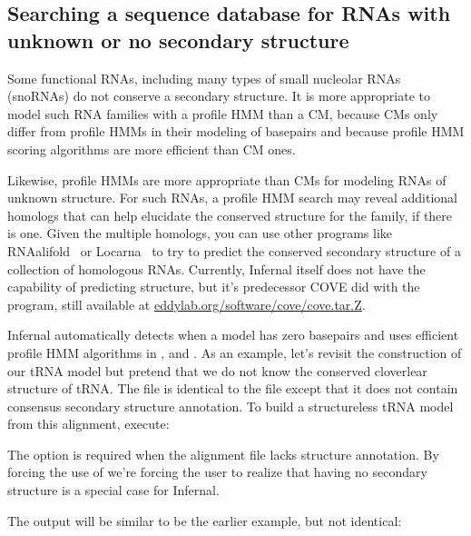 \subsection{Searching a sequence database for RNAs with unknown or no
 secondary structure}

Some functional RNAs, including many types of small nucleolar RNAs
(snoRNAs) do not conserve a secondary structure. It is more
appropriate to model such RNA families with a profile HMM than a CM,
because CMs only differ from profile HMMs in their modeling of
basepairs and because profile HMM scoring algorithms are more
efficient than CM ones.

Likewise, profile HMMs are more appropriate than CMs for modeling RNAs
of unknown structure. For such RNAs, a profile HMM search may reveal
additional homologs that can help elucidate the conserved structure
for the family, if there is one. Given the multiple homologs, you can
use other programs like RNAalifold~\citep{Bernhart08,Hofacker02} or
Locarna~\citep{Will12} to try to predict the conserved secondary
structure of a collection of homologous RNAs. Currently, Infernal
itself does not have the capability of predicting structure, but it's
predecessor COVE did with the  program, still available at
\url{eddylab.org/software/cove/cove.tar.Z}.

Infernal automatically detects when a model has zero basepairs and
uses efficient profile HMM algorithms in ,
 and . As an example, let's revisit the construction of our
tRNA model but pretend that we do not know the conserved cloverlear
structure of tRNA. The file 
 is identical to the file 
 except that it does not contain consensus
secondary structure annotation. 
To build a structureless tRNA model from this alignment, execute:


The  option is required when the alignment file lacks
structure annotation. By forcing the use of  we're
forcing the user to realize that having no secondary structure is a
special case for Infernal.

The output will be similar to be the earlier example, but not
identical:

